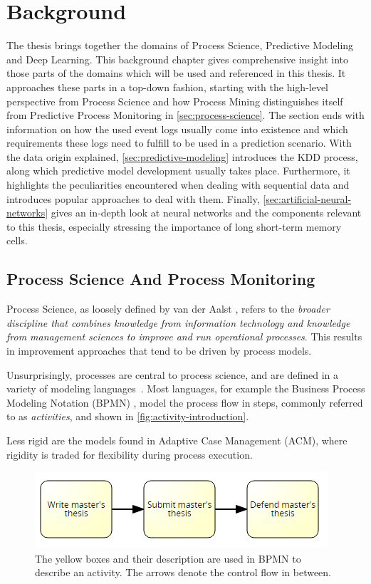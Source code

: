 \chapter{Background}\label{chap:background}
The thesis brings together the domains of Process Science, Predictive Modeling and Deep Learning. This background chapter gives comprehensive insight into those parts of the domains which will be used and referenced in this thesis. It approaches these parts in a top-down fashion, starting with the high-level perspective from Process Science and how Process Mining distinguishes itself from Predictive Process Monitoring in \autoref{sec:process-science}. The section ends with information on how the used event logs usually come into existence and which requirements these logs need to fulfill to be used in a prediction scenario.
With the data origin explained, \autoref{sec:predictive-modeling} introduces the KDD process, along which predictive model development usually takes place. Furthermore, it highlights the peculiarities encountered when dealing with sequential data and introduces popular approaches to deal with them.
Finally, \autoref{sec:artificial-neural-networks} gives an in-depth look at neural networks and the components relevant to this thesis, especially stressing the importance of long short-term memory cells.

\section{Process Science And Process Monitoring}\label{sec:process-science}
Process Science, as loosely defined by van der Aalst \cite{Aalst2016}, refers to the \textit{broader discipline that combines knowledge from information technology and knowledge from management sciences to improve and run operational processes}. This results in improvement approaches that tend to be driven by process models.

Unsurprisingly, processes are central to process science, and are defined in a variety of modeling languages~\cite{panagacos2012ultimate}. Most languages, for example the Business Process Modeling Notation (BPMN) \cite{bpmn2.0}, model the process flow in steps, commonly referred to as \textit{activities}, and shown in \autoref{fig:activity-introduction}.

Less rigid are the models found in Adaptive Case Management (ACM), where rigidity is traded for flexibility during process execution.

\begin{figure}
    \centering
    \includegraphics[width=.75\textwidth]{gfx/activity-introduction.png}
    \caption{The yellow boxes and their description are used in BPMN to describe an activity. The arrows denote the control flow in between.}
    \label{fig:activity-introduction}
\end{figure}

